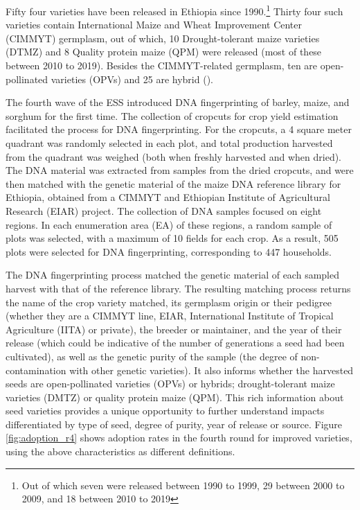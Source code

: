 \documentclass[11pt]{article}
\begin{document}
Fifty four varieties have been released in Ethiopia since 1990.\footnote{Out of which seven were released between 1990 to 1999, 29 between 2000 to 2009, and 18 between 2010 to 2019} Thirty four such varieties contain International Maize and Wheat Improvement Center (CIMMYT) germplasm, out of which, 10 Drought-tolerant maize varieties (DTMZ) and 8 Quality protein maize (QPM) were released (most of these between 2010 to 2019). Besides the CIMMYT-related germplasm, ten are open-pollinated varieties (OPVs) and 25 are hybrid (\citep{kosmowski2020shining}).

The fourth wave of the ESS introduced DNA fingerprinting of barley, maize, and sorghum for the first time. The collection of cropcuts for crop yield estimation facilitated the process for DNA fingerprinting. For the cropcuts, a 4 square meter quadrant was randomly selected in each plot, and total production harvested from the quadrant was weighed (both when freshly harvested and when dried). The DNA material was extracted from samples from the dried cropcuts, and were then matched with the genetic material of the maize DNA reference library for Ethiopia, obtained from a CIMMYT and Ethiopian Institute of Agricultural Research (EIAR) project. The collection of DNA samples focused on eight regions. In each enumeration area (EA) of these regions, a random sample of plots was selected, with a maximum of 10 fields for each crop. As a result, 505 plots were selected for DNA fingerprinting, corresponding to 447 households. 

The DNA fingerprinting process matched the genetic material of each sampled harvest with that of the reference library. The resulting matching process returns the name of the crop variety matched, its germplasm origin or their pedigree (whether they are a CIMMYT line, EIAR,  International Institute of Tropical Agriculture (IITA) or private), the breeder or maintainer, and the year of their release (which could be indicative of the number of generations a seed had been cultivated), as well as the genetic purity of the sample (the degree of non-contamination with other genetic varieties). It also informs whether the harvested seeds are open-pollinated varieties (OPVs) or hybrids; drought-tolerant maize varieties (DMTZ) or quality protein maize (QPM). This rich information about seed varieties provides a unique opportunity to further understand impacts differentiated by type of seed, degree of purity, year of release or source. Figure \ref{fig:adoption_r4} shows adoption rates in the fourth round for improved varieties, using the above characteristics as different definitions.
\end{document}
